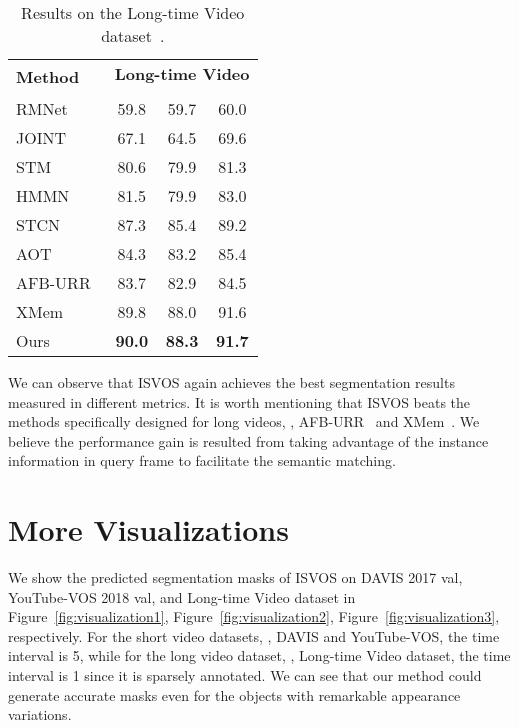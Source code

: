 \documentclass[10pt,twocolumn,letterpaper]{article}
\newcommand{\system}{ISVOS\xspace}
\begin{document}
\begin{table}[!ht]
	\centering
\setlength{\tabcolsep}{0pt} \begin{tabular*}{0.9\linewidth}{@{\extracolsep{\fill}}l | ccc }
		\toprule
		\multirow{2}{1in}{\textbf{Method}} & \multicolumn{3}{c}{\textbf{Long-time Video}}  \\
		~ &  &  &  \\
		\midrule
		RMNet~\cite{xie2021efficient} & 59.8 & 59.7 & 60.0 \\
		JOINT~\cite{mao2021joint} & 67.1 & 64.5 & 69.6 \\
		STM~\cite{oh2019video} & 80.6 & 79.9 & 81.3 \\ 
		HMMN~\cite{shi2015hierarchical} & 81.5 & 79.9 & 83.0 \\
		STCN~\cite{cheng2021stcn} & 87.3 & 85.4 & 89.2  \\
		AOT~\cite{yang2021associating} & 84.3 & 83.2 & 85.4 \\
		AFB-URR~\cite{liang2020video} & 83.7 & 82.9 &  84.5 \\
		XMem~\cite{cheng2022xmem} & 89.8 & 88.0 & 91.6 \\
		Ours & \textbf{90.0} & \textbf{88.3} & \textbf{91.7} \\
		\bottomrule
	\end{tabular*}
	\caption{Results on the Long-time Video dataset~\cite{liang2020video}. }
	\label{tab:long}
\end{table}

We can observe that \system again achieves the best segmentation results measured in different metrics. It is worth mentioning that \system beats the methods specifically designed for long videos, \eg, AFB-URR~\cite{liang2020video} and XMem~\cite{cheng2022xmem}. We believe the performance gain is resulted from taking advantage of the instance information in query frame to facilitate the semantic matching.

\section{More Visualizations}

We show the predicted segmentation masks of \system on DAVIS 2017 val, YouTube-VOS 2018 val, and Long-time Video dataset in Figure~\ref{fig:visualization1}, Figure~\ref{fig:visualization2}, Figure~\ref{fig:visualization3}, respectively. For the short video datasets, \ie, DAVIS and YouTube-VOS, the time interval is 5, while for the long video dataset, \ie, Long-time Video dataset, the time interval is 1 since it is sparsely annotated. We can see that our method could generate accurate masks even for the objects with remarkable appearance variations.
\end{document}
